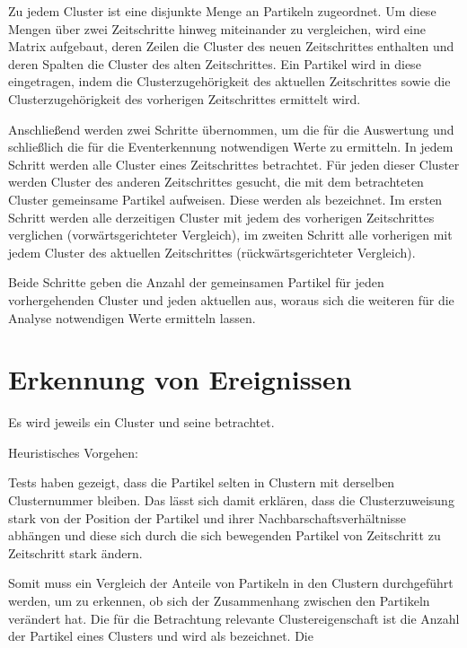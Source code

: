 Zu jedem Cluster ist eine disjunkte Menge an Partikeln zugeordnet. Um diese Mengen über zwei Zeitschritte hinweg miteinander zu vergleichen, wird eine Matrix aufgebaut, deren Zeilen die Cluster des neuen Zeitschrittes enthalten und deren Spalten die Cluster des alten Zeitschrittes. Ein Partikel wird in diese  eingetragen, indem die Clusterzugehörigkeit des aktuellen Zeitschrittes sowie die Clusterzugehörigkeit des vorherigen Zeitschrittes ermittelt wird.

Anschließend werden zwei Schritte übernommen, um die für die Auswertung und schließlich die für die Eventerkennung notwendigen Werte zu ermitteln. In jedem Schritt werden alle Cluster eines Zeitschrittes betrachtet. Für jeden dieser Cluster werden Cluster des anderen Zeitschrittes gesucht, die mit dem betrachteten Cluster gemeinsame Partikel aufweisen. Diese werden als  bezeichnet. Im ersten Schritt werden alle derzeitigen Cluster mit jedem des vorherigen Zeitschrittes verglichen (vorwärtsgerichteter Vergleich), im zweiten Schritt alle vorherigen mit jedem Cluster des aktuellen Zeitschrittes (rückwärtsgerichteter Vergleich).

Beide Schritte geben die Anzahl der gemeinsamen Partikel für jeden vorhergehenden Cluster und jeden aktuellen aus, woraus sich die weiteren für die Analyse notwendigen Werte ermitteln lassen.

\section{Erkennung von Ereignissen}\label{sec:ereigniserkennung}

Es wird jeweils ein Cluster und seine  betrachtet.

Heuristisches Vorgehen:

Tests haben gezeigt, dass die Partikel selten in Clustern mit derselben Clusternummer bleiben. Das lässt sich damit erklären, dass die Clusterzuweisung stark von der Position der Partikel und ihrer Nachbarschaftsverhältnisse abhängen und diese sich durch die sich bewegenden Partikel von Zeitschritt zu Zeitschritt stark ändern.

Somit muss ein Vergleich der Anteile von Partikeln in den Clustern durchgeführt werden, um zu erkennen, ob sich der Zusammenhang zwischen den Partikeln verändert hat. Die für die Betrachtung relevante Clustereigenschaft ist die Anzahl der Partikel eines Clusters und wird als  bezeichnet. Die 

